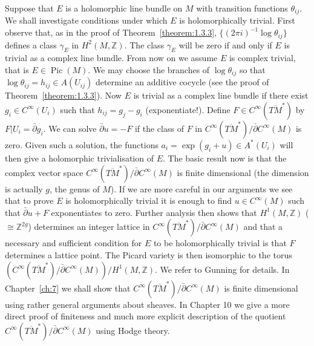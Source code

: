 Suppose that $E$ is a holomorphic line bundle on $M$ with transition functions $\theta_{ij}$. We shall investigate conditions under which $E$ is holomorphically trivial. First observe that, as in the proof of Theorem~\ref{theorem:1.3.3}, $\{(2\pi i)^{-1}\log\theta_{ij}\}$ defines a class $\gamma_E$ in $H^2(M,\mathbb Z)$. The class $\gamma_E$ will be zero if and only if $E$ is trivial as a complex line bundle. From now on we assume $E$ is complex trivial, that is $E\in\operatorname{Pic}(M)$. We may choose the branches of $\log\theta_{ij}$ so that $\log\theta_{ij}=h_{ij}\in A(U_{ij})$ determine an additive cocycle (see the proof of Theorem~\ref{theorem:1.3.3}). Now $E$ is trivial as a complex line bundle if there exist $g_i\in C^\infty(U_i)$ such that $h_{ij}=g_j-g_i$ (exponentiate!). Define $F\in C^\infty(\overline{TM}^*)$ by $F|U_i=\bar\partial g_i$. We can solve $\bar\partial u=-F$ if the class of $F$ in $C^\infty(\overline{TM}^*)/\bar\partial C^\infty(M)$ is zero. Given such a solution, the functions $a_i=\exp(g_i+u)\in A^*(U_i)$ will then give a holomorphic trivialisation of $E$. The basic result now is that the complex vector space $C^\infty(\overline{TM}^*)/\bar\partial C^\infty(M)$ is finite dimensional (the dimension is actually $g$, the genus of $M$). If we are more careful in our arguments we see that to prove $E$ is holomorphically trivial it is enough to find $u\in C^\infty(M)$ such that $\bar\partial u+F$ exponentiates to zero. Further analysis then shows that $H^1(M,\mathbb Z)$ ($\cong\mathbb Z^{2g}$) determines an integer lattice in $C^\infty(\overline{TM}^*)/\bar\partial C^\infty(M)$ and that a necessary and sufficient condition for $E$ to be holomorphically trivial is that $F$ determines a lattice point. The Picard variety is then isomorphic to the torus $(C^\infty(\overline{TM}^*)/\bar\partial C^\infty(M))/H^1(M,\mathbb Z)$. We
refer to Gunning \cite{bib:I:gunning-r-c:1} for details. In Chapter~\ref{ch:7} we shall show that $C^\infty(\overline{TM}^*)/\bar\partial C^\infty(M)$ is finite dimensional using rather general arguments about sheaves. In Chapter 10 we give a more direct proof of finiteness and much more explicit description of the quotient $C^\infty(\overline{TM}^*)/\bar\partial C^\infty(M)$ using Hodge theory.

